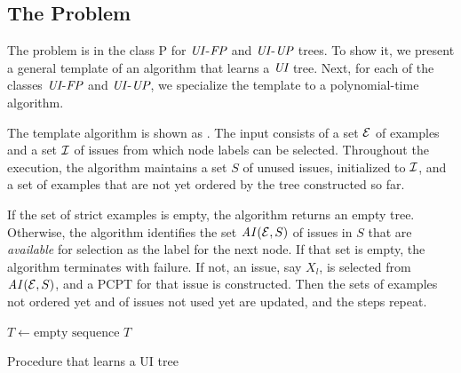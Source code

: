 \vspace{-0.1cm}
\subsection{The  Problem}
\vspace{-0.1cm}

The  problem is in the class P for $\textit{UI}$-$\textit{FP}$ and
$\textit{UI}$-$\textit{UP}$ trees. To show it, we present a general template of an 
algorithm that learns a $\textit{UI}$ tree. Next, for each of the classes 
$\textit{UI}$-$\textit{FP}$ and $\textit{UI}$-$\textit{UP}$, we specialize the template to a 
polynomial-time algorithm.

The template algorithm is shown as . The 
input consists of a set $\mathcal{E}$ of examples and a set $\mathcal{I}$ of issues 
from which node labels can be selected. Throughout the execution, the 
algorithm maintains a set $S$ of unused issues, initialized to $\mathcal{I}$, 
and a set of examples that are not yet ordered by the tree constructed 
so far.

If the set of strict examples is empty, the algorithm returns an empty tree. 
Otherwise, the algorithm identifies the set $\mathit{AI}(\mathcal{E},S)$ of issues in 
$S$ that are \emph{available} for selection as the label for the next 
node. If that set is empty, the algorithm terminates with failure. If
not, an issue, say $X_l$, is selected from $\mathit{AI}(\mathcal{E},S)$, and a PCPT for
that issue is constructed. Then the sets of examples not ordered yet 
and of issues not used yet are updated, and the steps repeat.  

\begin{algorithm}[ht]

	$T \leftarrow \mbox{empty sequence}$\;
        \Return $T$\;
\caption{Procedure  that learns a UI tree 
\label{alg:learnUI}}
\end{algorithm}

